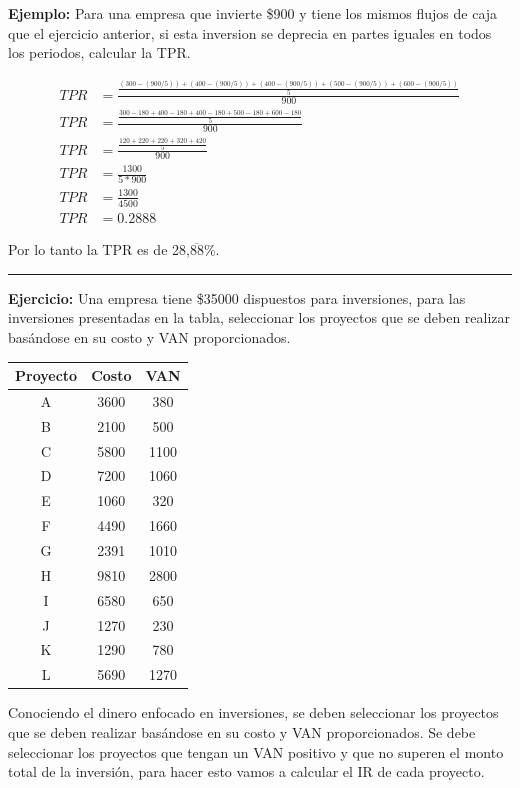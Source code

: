 \documentclass{templateNote}
\begin{document}
\textbf{Ejemplo:} Para una empresa que invierte \$900 y tiene los mismos flujos de caja que el ejercicio anterior, si esta inversion se deprecia en partes iguales en todos los periodos, calcular la TPR.

\begin{align*}
    TPR &= \frac{\frac{(300-(900/5)) + (400-(900/5)) + (400 -(900/5)) + (500 -(900/5)) + (600 -(900/5))}{5}}{900} \\
    TPR &= \frac{\frac{300-180 + 400-180 + 400-180 + 500-180 + 600-180}{5}}{900} \\
    TPR &= \frac{\frac{120 + 220 + 220 + 320 + 420}{5}}{900} \\
    TPR &= \frac{1300}{5*900} \\
    TPR &= \frac{1300}{4500} \\
    TPR &= 0.2888
\end{align*}

Por lo tanto la TPR es de 28,$\overline{88}$\%.

\rule{\linewidth}{0.1 mm}

\textbf{Ejercicio:} Una empresa tiene \$35000 dispuestos para inversiones, para las inversiones presentadas en la tabla, seleccionar los proyectos que se deben realizar basándose en su costo y VAN proporcionados.

\begin{center}
    \begin{tabular}{|c|c|c|}
        \hline
        Proyecto & Costo & VAN \\
        \hline
        A & 3600 & 380 \\
        B & 2100 & 500 \\
        C & 5800 & 1100 \\
        D & 7200 & 1060 \\
        E & 1060 & 320 \\
        F & 4490 & 1660 \\
        G & 2391 & 1010 \\
        H & 9810 & 2800 \\
        I & 6580 & 650 \\
        J & 1270 & 230 \\
        K & 1290 & 780 \\
        L & 5690 & 1270 \\
        \hline
    \end{tabular}
\end{center}

Conociendo el dinero enfocado en inversiones, se deben seleccionar los proyectos que se deben realizar basándose en su costo y VAN proporcionados. Se debe seleccionar los proyectos que tengan un VAN positivo y que no superen el monto total de la inversión, para hacer esto vamos a calcular el IR de cada proyecto.
\end{document}
